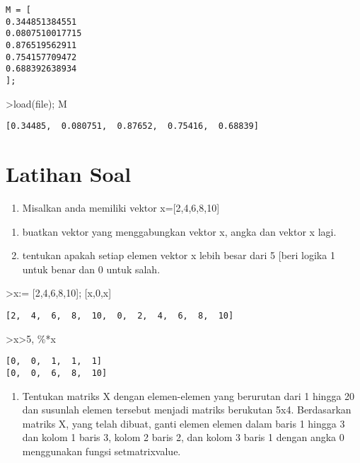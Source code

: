 \documentclass[
]{book}
\providecommand{\tightlist}{%
  \setlength{\itemsep}{0pt}\setlength{\parskip}{0pt}}
\begin{document}
\begin{verbatim}
M = [
0.344851384551
0.0807510017715
0.876519562911
0.754157709472
0.688392638934
];
\end{verbatim}

\textgreater load(file); M

\begin{verbatim}
[0.34485,  0.080751,  0.87652,  0.75416,  0.68839]
\end{verbatim}

\section{Latihan Soal}\label{latihan-soal-2}

\begin{enumerate}
\def\labelenumi{\arabic{enumi}.}
\tightlist
\item
  Misalkan anda memiliki vektor x={[}2,4,6,8,10{]}
\end{enumerate}

\begin{enumerate}
\def\labelenumi{\alph{enumi}.}
\item
  buatkan vektor yang menggabungkan vektor x, angka dan vektor x lagi.
\item
  tentukan apakah setiap elemen vektor x lebih besar dari 5 {[}beri logika 1 untuk benar dan 0 untuk salah.
\end{enumerate}

\textgreater x:= {[}2,4,6,8,10{]}; {[}x,0,x{]}

\begin{verbatim}
[2,  4,  6,  8,  10,  0,  2,  4,  6,  8,  10]
\end{verbatim}

\textgreater x\textgreater5, \%*x

\begin{verbatim}
[0,  0,  1,  1,  1]
[0,  0,  6,  8,  10]
\end{verbatim}

\begin{enumerate}
\def\labelenumi{\arabic{enumi}.}
\setcounter{enumi}{1}
\tightlist
\item
  Tentukan matriks X dengan elemen-elemen yang berurutan dari 1 hingga 20 dan susunlah elemen tersebut menjadi matriks berukutan 5x4. Berdasarkan matriks X, yang telah dibuat, ganti elemen elemen dalam baris 1 hingga 3 dan kolom 1 baris 3, kolom 2 baris 2, dan kolom 3 baris 1 dengan angka 0 menggunakan fungsi setmatrixvalue.
\end{enumerate}
\end{document}
